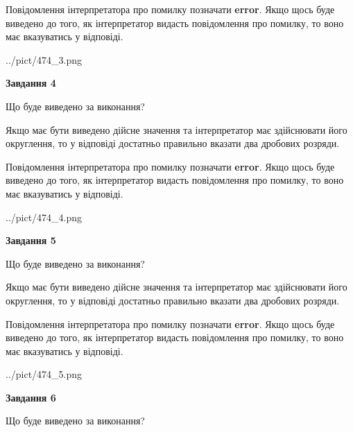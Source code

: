 \documentclass[12pt, ukrainian]{article}
\begin{document}
{\begin {Large}
Повідомлення інтерпретатора про помилку позначати \textbf{error}.
Якщо щось буде виведено до того, як інтерпретатор видасть повідомлення про помилку, 
то воно має вказуватись у відповіді. \par

\begin{center}
	{../pict/474_3.png}
\end{center}
\newpage

{\begin {center}\textbf{Завдання 4}\end {center}}\par
Що буде виведено за виконання? \par

Якщо має бути виведено дійсне значення та інтерпретатор має здійснювати його округлення, 
то у відповіді достатньо правильно вказати два дробових розряди.

Повідомлення інтерпретатора про помилку позначати \textbf{error}.
Якщо щось буде виведено до того, як інтерпретатор видасть повідомлення про помилку, 
то воно має вказуватись у відповіді. \par

\begin{center}
	{../pict/474_4.png}
\end{center}
\newpage

{\begin {center}\textbf{Завдання 5}\end {center}}\par
Що буде виведено за виконання? \par

Якщо має бути виведено дійсне значення та інтерпретатор має здійснювати його округлення, 
то у відповіді достатньо правильно вказати два дробових розряди.

Повідомлення інтерпретатора про помилку позначати \textbf{error}.
Якщо щось буде виведено до того, як інтерпретатор видасть повідомлення про помилку, 
то воно має вказуватись у відповіді. \par

\begin{center}
	{../pict/474_5.png}
\end{center}
\newpage

{\begin {center}\textbf{Завдання 6}\end {center}}\par
Що буде виведено за виконання? \par


\end{Large}}
\end{document}
